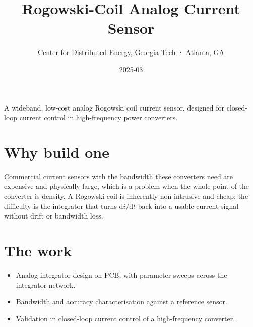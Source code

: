 \title{Rogowski-Coil Analog Current Sensor}
\subtitle{Center for Distributed Energy, Georgia Tech · Atlanta, GA}
\date{2025-03}




A wideband, low-cost analog Rogowski coil current sensor, designed for
closed-loop current control in high-frequency power converters.

\section{Why build one}

Commercial current sensors with the bandwidth these converters need are
expensive and physically large, which is a problem when the whole point of the
converter is density. A Rogowski coil is inherently non-intrusive and cheap; the
difficulty is the integrator that turns $\mathrm{d}i/\mathrm{d}t$ back into a
usable current signal without drift or bandwidth loss.

\section{The work}

\begin{itemize}
  \item Analog integrator design on PCB, with parameter sweeps across the
        integrator network.
  \item Bandwidth and accuracy characterisation against a reference sensor.
  \item Validation in closed-loop current control of a high-frequency converter.
\end{itemize}


